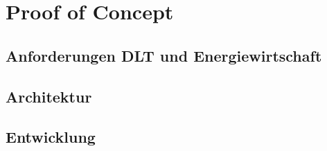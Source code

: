 \section{Proof of Concept}

\subsection{Anforderungen DLT und Energiewirtschaft}

\subsection{Architektur}

\subsection{Entwicklung}

\newpage